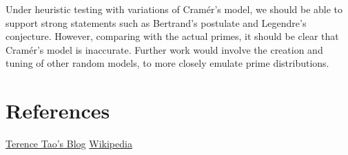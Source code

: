 \documentclass[12pt, letterpaper]{article}
\begin{document}
Under heuristic testing with variations of Cram\'er's model, we should be able to support strong statements such as Bertrand's postulate and Legendre's conjecture. However, comparing with the actual primes, it should be clear that Cram\'er's model is inaccurate. Further work would involve the creation and tuning of other random models, to more closely emulate prime distributions.

\section{References}

\href{http://terrytao.wordpress.com/2015/01/04/254a-supplement-4-probabilistic-models-and-heuristics-for-the-primes-optional/#more-7956}{Terence Tao's Blog}
\href{https://en.wikipedia.org/wiki/Prime_gap}{Wikipedia}

 
\end{document}
